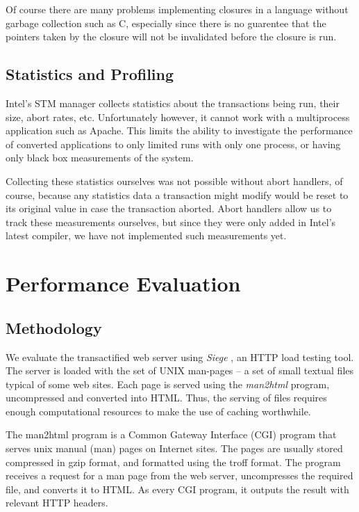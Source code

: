 \documentclass[preprint,11pt]{sigplanconf}
\let \cite = \citep
\begin{document}
Of course there are many problems implementing closures in a language without
garbage collection such as C, especially since there is no guarentee that the
pointers taken by the closure will not be invalidated before the closure is run.


\subsection{Statistics and Profiling}\label{sec:wishlist-statistics}
Intel's STM manager collects statistics about the transactions being run, their
size, abort rates, etc. Unfortunately however, it cannot work with a
multiprocess application such as Apache. This limits the ability to investigate
the performance of converted applications to only limited runs with only one
process, or having only black box measurements of the system.

Collecting these statistics ourselves was not possible without abort handlers,
of course, because any statistics data a transaction might modify would be
reset to its original value in case the transaction aborted. Abort handlers
allow us to track these measurements ourselves, but since they were only
added in Intel's latest compiler, we have not implemented such measurements yet.

\section{Performance Evaluation}\label{sec:evaluation}
\subsection{Methodology} 

We evaluate the transactified web server  using \emph{Siege} \cite{siege}, an
HTTP load testing tool. The server is loaded with the set of UNIX man-pages -- a
set of small textual files typical of some web sites. Each page is served using
the \emph{man2html} program, uncompressed and converted into HTML.
Thus,  
the serving of files requires enough computational resources to make the use of
caching worthwhile.

The man2html program is a Common Gateway Interface (CGI) program that serves
unix manual (man) pages on Internet sites. The pages are usually stored
compressed in gzip format, and formatted using the troff format. The program
receives a request for a man page from the web server, uncompresses the required
file, and converts it to HTML. As every CGI program, it outputs the result with
relevant HTTP headers.
\end{document}
